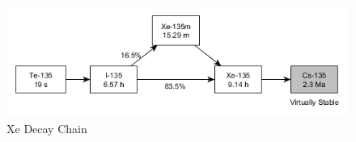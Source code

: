 \begin{figure}[ht]
\includegraphics[width=\textwidth,height=\textheight,keepaspectratio]{XeDecay.png} 
\caption{Xe Decay Chain}
\label{fig:XeDecay}
\end{figure}